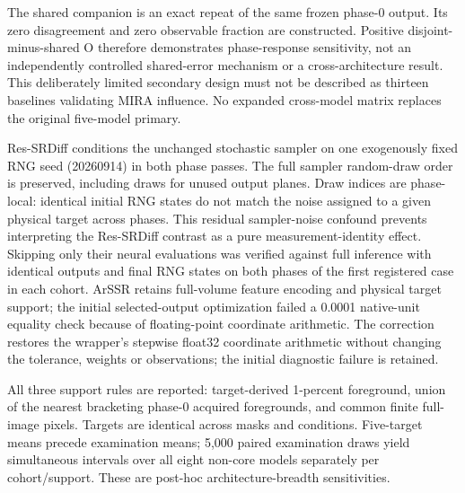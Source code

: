 The shared companion is an exact repeat of the same frozen phase-0 output. Its zero disagreement and zero observable fraction are constructed. Positive disjoint-minus-shared O therefore demonstrates phase-response sensitivity, not an independently controlled shared-error mechanism or a cross-architecture result. This deliberately limited secondary design must not be described as thirteen baselines validating MIRA influence. No expanded cross-model matrix replaces the original five-model primary.

Res-SRDiff conditions the unchanged stochastic sampler on one exogenously fixed RNG seed (20260914) in both phase passes. The full sampler random-draw order is preserved, including draws for unused output planes. Draw indices are phase-local: identical initial RNG states do not match the noise assigned to a given physical target across phases. This residual sampler-noise confound prevents interpreting the Res-SRDiff contrast as a pure measurement-identity effect. Skipping only their neural evaluations was verified against full inference with identical outputs and final RNG states on both phases of the first registered case in each cohort. ArSSR retains full-volume feature encoding and physical target support; the initial selected-output optimization failed a 0.0001 native-unit equality check because of floating-point coordinate arithmetic. The correction restores the wrapper's stepwise float32 coordinate arithmetic without changing the tolerance, weights or observations; the initial diagnostic failure is retained.

All three support rules are reported: target-derived 1-percent foreground, union of the nearest bracketing phase-0 acquired foregrounds, and common finite full-image pixels. Targets are identical across masks and conditions. Five-target means precede examination means; 5,000 paired examination draws yield simultaneous intervals over all eight non-core models separately per cohort/support. These are post-hoc architecture-breadth sensitivities.


